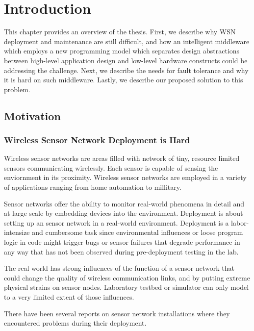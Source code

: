 \cleardoublepage
\singlespacing
\chapter{Introduction}
\label{c:intro}
\doublespacing\nointerlineskip

This chapter provides an overview of the thesis. First, we describe why
WSN deployment and maintenance are still difficult, and how 
an intelligent middleware which employs a new programming model which separates
design abstractions between high-level application design and low-level
hardware constructs could be addressing the challenge. Next, we describe
the needs for fault tolerance and why it is hard on such middleware. Lastly, we
describe our proposed solution to this problem.

\section{Motivation}

\subsection{Wireless Sensor Network Deployment is Hard}

Wireless sensor networks are areas filled with network of tiny, resource
limited sensors communicating wirelessly. Each sensor is capable of sensing the
enviornment in its proximity. Wireless sensor networks are employed in
a variety of applications ranging from home automation to millitary.

Sensor networks offer the ability to monitor real-world phenomena in detail and
at large scale by embedding devices into the environment. Deployment is
about setting up an sensor network in a real-world environment. Deployment is
a labor-intensize and cumbersome task since environmental influences or
loose program logic in code might trigger bugs or sensor failures that
degrade performance in any way that has not been observed during pre-deployment
testing in the lab.

The real world has strong influences of the function of a sensor network that
could change the quality of wireless communication links, and by putting
extreme physical strains on sensor nodes. Laboratory testbed or simulator can 
only model to a very limited extent of those influences.

There have been several reports on sensor network installations where they
encountered problems during their
deployment\cite{Barrenetxea2008}\cite{Polastre2004}\cite{Arora2004}\cite{Tateson2005}\cite{Padhy2005}\cite{Stoianov2007}\cite{Tolle2005}\cite{Werner-Allen2006a}.

